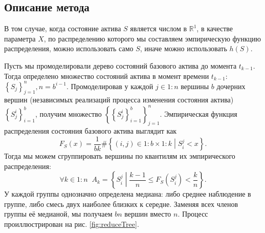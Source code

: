 \documentclass[specialist,
               substylefile = spbu.rtx,
               subf,href,colorlinks=true, 12pt]{disser}
\newcommand{\R}{\ensuremath{\mathbb{R}}}
\begin{document}
	    \subsection{Описание метода}
        \par В том случае, когда состояние актива $S$ является числом в $\R ^1$, в качестве параметра $X$, по распределению которого мы составляем эмпирическую функцию распределения, можно использовать  само $S$, иначе можно использовать $h(S)$.
        \par Пусть мы промоделировали дерево состояний базового актива до момента $t_{k-1}$. Тогда определено множество состояний актива в момент времени $t_{k-1}$: $\left\lbrace S_j \right\rbrace_{j=1}^n, n=b^{i-1}$. Промоделировав у каждой $j\in 1:n$ вершины $b$ дочерних вершин (независимых реализаций процесса изменения состояния актива) $\left\lbrace S_j^i\right\rbrace_{i=1}^b$, получим множество $\left\lbrace\left\lbrace S_j^i \right\rbrace_{i=1}^b\right\rbrace_{j=1}^n$. Эмпирическая функция распределения состояния базового актива выглядит как
        $$F_{S}(x) = \frac{1}{bk}\#\left\lbrace (i, j) \in 1:b \times 1:k \middle\vert S_i^j < x \right\rbrace.$$
        Тогда мы можем сгруппировать вершины по квантилям их эмпирического распределения:
        $$\forall k\in 1:n \;\; A_k = \left\lbrace S_i^j \middle\vert \frac{k-1}{n} \leq F_{S}(S_i^j) < \frac{k}{n}\right\rbrace.$$
        У каждой группы однозначно определена медиана: либо среднее наблюдение в группе, либо смесь двух наиболее близких к середне. Заменяя всех членов группы её медианой, мы получаем $bn$ вершин вместо $n$. Процесс проиллюстрирован на рис. \ref{fig:reduceTree}.
\end{document}
